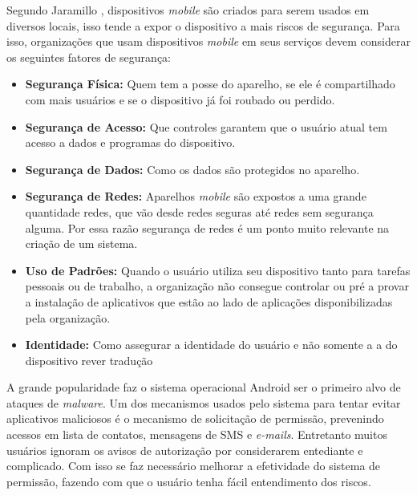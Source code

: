 Segundo Jaramillo \cite{jaramillo2013cross}, dispositivos \textit{mobile} são criados para serem usados em diversos locais, isso tende a expor o dispositivo a mais riscos de segurança.  Para isso, organizações que usam dispositivos \textit{mobile} em seus serviços devem considerar os seguintes fatores de segurança:
\begin{itemize}
    \item \textbf{Segurança Física:} Quem tem a posse do aparelho, se ele é compartilhado com mais usuários e se o dispositivo já foi roubado ou perdido.
    \item \textbf{Segurança de Acesso:} Que controles garantem que o usuário atual tem acesso a dados e programas do dispositivo.   
    \item \textbf{Segurança de Dados:} Como os dados são protegidos no aparelho. 
    \item \textbf{Segurança de Redes:} Aparelhos \textit{mobile} são expostos a uma grande quantidade redes, que vão desde redes seguras até redes sem segurança alguma. Por essa razão segurança de redes é um ponto muito relevante na criação de um sistema.
    \item \textbf{Uso de Padrões:} Quando o usuário utiliza seu dispositivo tanto para tarefas pessoais ou de trabalho, a organização não consegue controlar ou  pré a provar a instalação de aplicativos que estão ao lado de aplicações disponibilizadas pela organização. 
    \item \textbf{Identidade:} Como assegurar a identidade do usuário e não somente a a do dispositivo rever tradução
\end{itemize}

A grande popularidade faz o sistema operacional Android ser o primeiro alvo de ataques de \textit{malware}. Um dos mecanismos usados pelo sistema para tentar evitar aplicativos maliciosos é o mecanismo de solicitação de permissão, prevenindo acessos em lista de contatos, mensagens de SMS e \textit{e-mails}. Entretanto muitos usuários ignoram os avisos de autorização por considerarem entediante e complicado. Com isso se faz necessário melhorar a efetividade do sistema de permissão, fazendo com que o usuário tenha fácil entendimento dos riscos. \cite{wang2017android}


